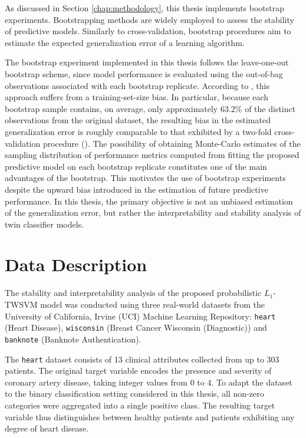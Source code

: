 \documentclass[12pt]{report} %
\begin{document}
As discussed in Section \ref{chap:methodology}, this thesis implements bootstrap experiments. Bootstrapping methods are widely employed to assess the stability of predictive models. Similarly to cross-validation, bootstrap procedures aim to estimate the expected generalization error of a learning algorithm.

The bootstrap experiment implemented in this thesis follows the leave-one-out bootstrap scheme, since model performance is evaluated using the out-of-bag observations associated with each bootstrap replicate. According to \cite{chernick2014introduction}, this approach suffers from a training-set-size bias. In particular, because each bootstrap sample contains, on average, only approximately $63.2\%$ of the distinct observations from the original dataset, the resulting bias in the estimated generalization error is roughly comparable to that exhibited by a two-fold cross-validation procedure (\cite{hastie2009elements}). The possibility of obtaining Monte-Carlo estimates of the sampling distribution of performance metrics computed from fitting the proposed predictive model on each bootstrap replicate constitutes one of the main advantages of the bootstrap. This motivates the use of bootstrap experiments despite the upward bias introduced in the estimation of future predictive performance. In this thesis, the primary objective is not an unbiased estimation of the generalization error, but rather the interpretability and stability analysis of twin classifier models.



\chapter{Data Description} \label{chap:data}

The stability and interpretability analysis of the proposed probabilistic $L_1$-TWSVM model was conducted using three real-world datasets from the University of California, Irvine (UCI) Machine Learning Repository: \texttt{heart} (Heart Disease), \texttt{wisconsin} (Breast Cancer Wisconsin (Diagnostic)) and \texttt{banknote} (Banknote Authentication).

The \texttt{heart} dataset consists of 13 clinical attributes collected from up to 303 patients. The original target variable encodes the presence and severity of coronary artery disease, taking integer values from 0 to 4. To adapt the dataset to the binary classification setting considered in this thesis, all non-zero categories were aggregated into a single positive class. The resulting target variable thus distinguishes between healthy patients and patients exhibiting any degree of heart disease.
\end{document}
